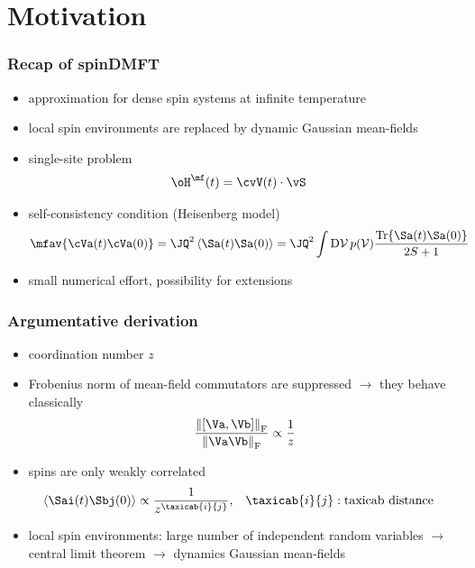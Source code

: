 \section{ Motivation }

\begin{frame}
	\frametitle{ Recap of spinDMFT\slidecite{\graesA} }
    \begin{minipage}[t]{0.7\textwidth}
    \begin{itemize}
        \item approximation for dense spin systems at infinite temperature
        \item local spin environments are replaced by dynamic Gaussian mean-fields
        \item single-site problem 
        \begin{align*}
            \oH^{\mf}(t) &= \cvV(t) \cdot \vS
        \end{align*}
        \item self-consistency condition (Heisenberg model)
        \begin{align*}
            \mfav{ \cVa(t) \cVa(0) } &= \JQ^2 \expval{ \Sa(t) \Sa(0) } = \JQ^2 \int \mathrm{D}\mathcal{V} \, p(\mathcal{V}) \frac{\Tr{ \Sa(t) \Sa(0) }}{2S+1}
        \end{align*}
        \item small numerical effort, possibility for extensions
    \end{itemize}
    \end{minipage}
    \begin{minipage}[t]{0.29\textwidth}
    \vspace{-1cm}
    \begin{figure}
        \centering 
        
    \end{figure}
    \end{minipage}
\end{frame}

\begin{frame}
	\frametitle{ Argumentative derivation }
    \begin{itemize}
        \item coordination number $z$
        \item Frobenius norm of mean-field commutators are suppressed $\rightarrow$ they behave classically
        \begin{align*}
            \frac{\norm{\left[\Va,\Vb\right]}_{\text{F}}}{\norm{\Va\Vb}_{\text{F}}} \propto \frac1{z}
        \end{align*}
        \item spins are only weakly correlated
        \begin{align*}
            \expval{\Sai(t) \Sbj(0)} &\propto \frac1{z^{\taxicab{i}{j}}}, & \taxicab{i}{j}&: \text{taxicab distance} 
        \end{align*}
        \item local spin environments: large number of independent random variables
        $\rightarrow$ central limit theorem 
        $\rightarrow$ dynamics Gaussian mean-fields
    \end{itemize}
\end{frame}

